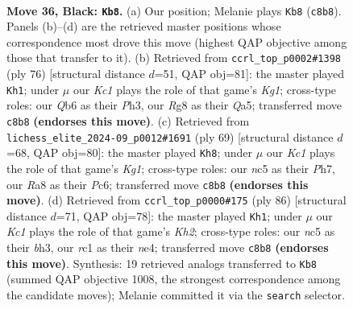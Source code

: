 \documentclass[11pt]{article}
\begin{document}
\clearpage

\begin{figure}[p]\centering
\begin{subfigure}{0.46\textwidth}\centering
\resizebox{\linewidth}{!}{%
\newchessgame
\chessboard[
  setfen={r1k3r1/p2Q1p1p/1qp5/2Nb4/3P4/6PP/5P2/2R3K1 b - - 4 36},
  showmover=false,
  pgfstyle=straightmove, color=movearrow, markmove={c8-b8}
]}
\caption{}
\end{subfigure}\hfill
\begin{subfigure}{0.46\textwidth}\centering
\resizebox{\linewidth}{!}{%
\newchessgame
\chessboard[
  setfen={2r3k1/5p2/6p1/Q6p/6n1/2B4P/PP3qP1/4R1K1 w - - 1 39},
  showmover=false,
  pgfstyle=straightmove, color=movearrow, markmove={g1-h1}
]}
\caption{}
\end{subfigure}
\\[4pt]
\begin{subfigure}{0.46\textwidth}\centering
\resizebox{\linewidth}{!}{%
\newchessgame
\chessboard[
  setfen={r5k1/5Q1p/2p3pq/2N5/p3P3/P6b/6P1/5R1K b - - 4 35},
  showmover=false,
  pgfstyle=straightmove, color=movearrow, markmove={g8-h8}
]}
\caption{}
\end{subfigure}\hfill
\begin{subfigure}{0.46\textwidth}\centering
\resizebox{\linewidth}{!}{%
\newchessgame
\chessboard[
  setfen={8/5ppk/8/3p3p/3BnP2/3QP1qb/PPR4K/2R5 w - - 4 44},
  showmover=false,
  pgfstyle=straightmove, color=movearrow, markmove={h2-h1}
]}
\caption{}
\end{subfigure}
\caption{\textbf{Move 36, Black: \texttt{Kb8}.} (a) Our position; Melanie plays \texttt{Kb8} (\texttt{c8b8}). Panels (b)--(d) are the retrieved master positions whose correspondence most drove this move (highest QAP objective among those that transfer to it). (b) Retrieved from \texttt{ccrl\_top\_p0002\#1398} (ply 76) [structural distance $d$=51, QAP obj=81]: the master played \texttt{Kh1}; under $\mu$ our \emph{Kc1} plays the role of that game's \emph{Kg1}; cross-type roles: our \emph{Q}b6 as their \emph{P}h3, our \emph{R}g8 as their \emph{Q}a5; transferred move \texttt{c8b8} \textbf{(endorses this move)}. (c) Retrieved from \texttt{lichess\_elite\_2024-09\_p0012\#1691} (ply 69) [structural distance $d$=68, QAP obj=80]: the master played \texttt{Kh8}; under $\mu$ our \emph{Kc1} plays the role of that game's \emph{Kg1}; cross-type roles: our \emph{n}c5 as their \emph{P}h7, our \emph{R}a8 as their \emph{P}c6; transferred move \texttt{c8b8} \textbf{(endorses this move)}. (d) Retrieved from \texttt{ccrl\_top\_p0000\#175} (ply 86) [structural distance $d$=71, QAP obj=78]: the master played \texttt{Kh1}; under $\mu$ our \emph{Kc1} plays the role of that game's \emph{Kh2}; cross-type roles: our \emph{n}c5 as their \emph{b}h3, our \emph{r}c1 as their \emph{n}e4; transferred move \texttt{c8b8} \textbf{(endorses this move)}. Synthesis: 19 retrieved analogs transferred to \texttt{Kb8} (summed QAP objective 1008, the strongest correspondence among the candidate moves); Melanie committed it via the \texttt{search} selector.}
\label{fig:thought-m71}
\end{figure}
\end{document}
